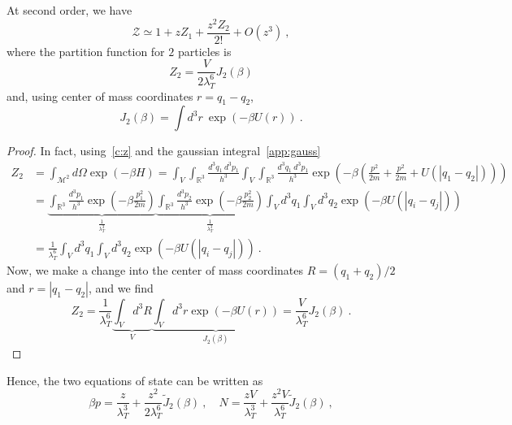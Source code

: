     At second order, we have 
    \begin{equation*}
        \mathcal Z \simeq 1 + z Z_1 + \frac{z^2 Z_2}{2!} + O(z^3) ~,
    \end{equation*}
    where the partition function for $2$ particles is 
    \begin{equation*}
        Z_2 = \frac{V}{2 \lambda_T^6} J_2 (\beta) 
    \end{equation*}
    and, using center of mass coordinates $r = q_1 - q_2$,
    \begin{equation*}
        J_2 (\beta) = \int d^3 r ~ \exp(- \beta U(r)) ~.
    \end{equation*}
    \begin{proof}
        In fact, using~\eqref{c:z} and the gaussian integral~\eqref{app:gauss}
        \begin{equation*}
        \begin{aligned}
            Z_2 & = \int_{\mathcal M^2} d \Omega \exp(- \beta H) = \int_V \int_{\mathbb R^3}\frac{d^3 q_1 ~ d^3 p_1}{h^3} \int_V \int_{\mathbb R^3}\frac{d^3 q_1 ~ d^3 p_1}{h^3} \exp(- \beta (\frac{p^2}{2m} + \frac{p^2}{2m} + U(|q_1 - q_2|))) \\ & = \underbrace{\int_{\mathbb R^3} \frac{d^3 p_1}{h^3} \exp(- \beta \frac{p_1^2}{2m})}_{\frac{1}{\lambda_T^3}} \underbrace{\int_{\mathbb R^3} \frac{d^3 p_2}{h^3} \exp(- \beta \frac{p_2^2}{2m})}_{\frac{1}{\lambda_T^3}} \int_V d^3 q_1 \int_V d^3 q_2 \exp(- \beta U(|q_i - q_j|)) \\ & = \frac{1}{\lambda_T^6} \int_V d^3 q_1 \int_V d^3 q_2 \exp(- \beta U(|q_i - q_j|)) ~.
        \end{aligned}
        \end{equation*}
        Now, we make a change into the center of mass coordinates $R = (q_1 + q_2)/2$ and $r = |q_1 - q_2|$, and we find
        \begin{equation*}
            Z_2 = \frac{1}{\lambda_T^6} \underbrace{\int_V d^3 R}_V \underbrace{\int_V d^3 r \exp(- \beta U(r)) }_{J_2 (\beta)} = \frac{V}{\lambda_T^6} J_2 (\beta) ~.
        \end{equation*}
    \end{proof}
    Hence, the two equations of state can be written as 
    \begin{equation*}
        \beta p = \frac{z}{\lambda_T^3} + \frac{z^2}{2 \lambda_T^6} \tilde J_2 (\beta) ~, \quad N = \frac{z V}{\lambda_T^3} + \frac{z^2 V }{\lambda_T^6} \tilde J_2 (\beta) ~,
    \end{equation*}
